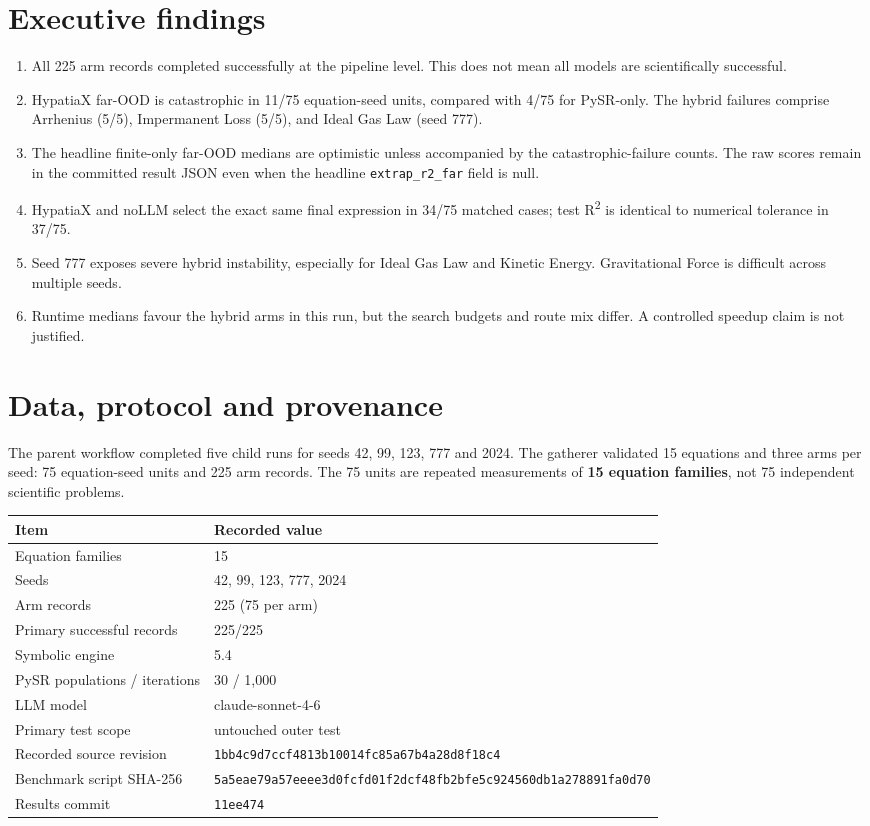 \documentclass[11pt,a4paper]{article}
\begin{document}
\section{Executive findings}
\begin{enumerate}
\item All 225 arm records completed successfully at the pipeline level. This does not mean all models are scientifically successful.
\item HypatiaX far-OOD is catastrophic in 11/75 equation-seed units, compared with 4/75 for PySR-only. The hybrid failures comprise Arrhenius (5/5), Impermanent Loss (5/5), and Ideal Gas Law (seed 777).
\item The headline finite-only far-OOD medians are optimistic unless accompanied by the catastrophic-failure counts. The raw scores remain in the committed result JSON even when the headline \texttt{extrap\_r2\_far} field is null.
\item HypatiaX and noLLM select the exact same final expression in 34/75 matched cases; test R\textsuperscript{2} is identical to numerical tolerance in 37/75.
\item Seed 777 exposes severe hybrid instability, especially for Ideal Gas Law and Kinetic Energy. Gravitational Force is difficult across multiple seeds.
\item Runtime medians favour the hybrid arms in this run, but the search budgets and route mix differ. A controlled speedup claim is not justified.
\end{enumerate}

\section{Data, protocol and provenance}
The parent workflow completed five child runs for seeds 42, 99, 123, 777 and 2024. The gatherer validated 15 equations and three arms per seed: 75 equation-seed units and 225 arm records. The 75 units are repeated measurements of \textbf{15 equation families}, not 75 independent scientific problems.

\begin{tabularx}{\linewidth}{@{}lX@{}}
\toprule
Item & Recorded value\\
\midrule
Equation families & 15\\
Seeds & 42, 99, 123, 777, 2024\\
Arm records & 225 (75 per arm)\\
Primary successful records & 225/225\\
Symbolic engine & 5.4\\
PySR populations / iterations & 30 / 1,000\\
LLM model & claude-sonnet-4-6\\
Primary test scope & untouched outer test\\
Recorded source revision & \texttt{1bb4c9d7ccf4813b10014fc85a67b4a28d8f18c4}\\
Benchmark script SHA-256 & \texttt{5a5eae79a57eeee3d0fcfd01f2dcf48fb2bfe5c924560db1a278891fa0d70}\\
Results commit & \texttt{11ee474}\\
\bottomrule
\end{tabularx}
\end{document}
